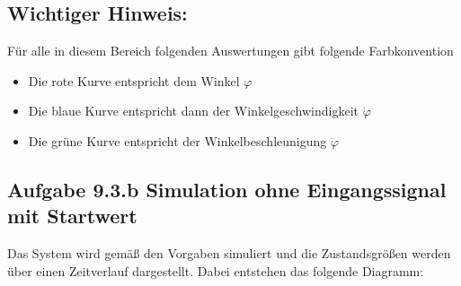 \documentclass[10pt]{scrartcl}
\begin{document}


\subsection{Wichtiger Hinweis:}
Für alle in diesem Bereich folgenden Auswertungen gibt folgende Farbkonvention
\begin{itemize}
\item Die rote Kurve entspricht dem Winkel $\varphi$
\item Die blaue Kurve entspricht dann der Winkelgeschwindigkeit $\dot \varphi$
\item Die grüne Kurve entspricht der Winkelbeschleunigung  $ \ddot \varphi$
\end{itemize}



\subsection{Aufgabe 9.3.b Simulation ohne Eingangssignal mit Startwert}
Das System wird gemäß den Vorgaben simuliert und die Zustandsgrößen werden über einen Zeitverlauf dargestellt. Dabei entstehen das folgende Diagramm:
\end{document}
